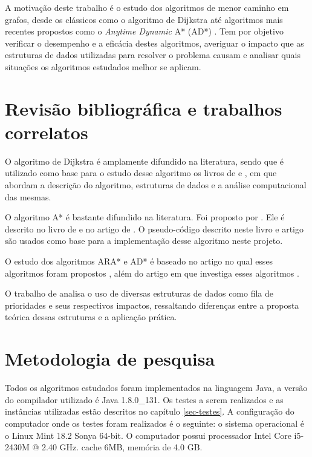 
A motivação deste trabalho é o estudo dos algoritmos de menor caminho em grafos, desde os clássicos como o algoritmo de Dijkstra \cite{dijkstra1959note} até algoritmos mais recentes propostos como o \textit{Anytime Dynamic} A* (AD*) \cite{likhachev2008anytime}. Tem por  objetivo verificar o desempenho e a eficácia destes algoritmos, averiguar o impacto que as estruturas de dados utilizadas para resolver o problema causam e analisar quais situações os algoritmos estudados melhor se aplicam.

\section{Revisão bibliográfica e trabalhos correlatos}
\label{sec-intro-correlatos}
O algoritmo de Dijkstra é amplamente difundido na literatura, sendo que é utilizado como base para o estudo desse algoritmo os livros de  e , em que abordam a descrição do algoritmo, estruturas de dados e a análise computacional das mesmas.

O algoritmo A* é bastante difundido na literatura. Foi proposto por . Ele é descrito no livro de  e no artigo de . O pseudo-código descrito neste livro e artigo são usados como base para a implementação desse algoritmo neste projeto.

O estudo dos algoritmos ARA* e AD* é baseado no artigo no qual esses algoritmos foram propostos \cite{likhachev2008anytime}, além do artigo em que investiga esses algoritmos \cite{moura2010estudo}.

O trabalho de  analisa o uso de diversas estruturas de dados como fila de prioridades e seus respectivos impactos, ressaltando diferenças entre a proposta teórica dessas estruturas e a aplicação prática.
\section{Metodologia de pesquisa}
\label{sec-intro-metodologia}
Todos os algoritmos estudados foram implementados na linguagem Java, a versão do compilador utilizado é Java 1.8.0\_131. Os testes a serem realizados e as instâncias utilizadas estão descritos no capítulo \ref{sec-testes}. A configuração do computador onde os testes foram realizados é o seguinte: o sistema operacional é o Linux Mint 18.2 Sonya 64-bit. O computador possui processador Intel Core i5-2430M @ 2.40 GHz. cache 6MB, memória de 4.0 GB.
\newpage
